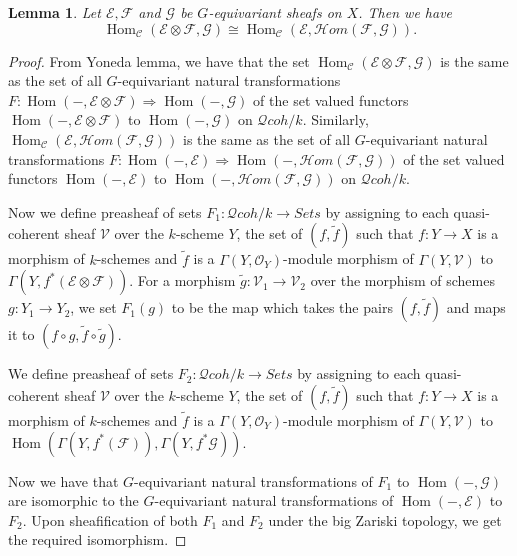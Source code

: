 \documentclass{article}
\newcommand{\Hom}{\operatorname{Hom}}
\newcommand{\sheafhom}{\mathcal{H}\mathit{om}}
\newcommand{\cat}{\mathcal C} %
\newtheorem{lemma}{Lemma}
\begin{document}
\begin{lemma}
  Let $\mathcal E,\mathcal F$ and $\mathcal G$ be $G$-equivariant sheafs on $X$. Then we have
  $$\Hom_\cat(\mathcal E \otimes \mathcal F, \mathcal G) \cong\Hom_\cat(\mathcal E,\sheafhom(\mathcal F,\mathcal G)).$$
\end{lemma}
\begin{proof}
  From Yoneda lemma, we have that the set $\Hom_\cat(\mathcal E \otimes \mathcal F,\mathcal G)$ is the same as 
  the set of all $G$-equivariant natural transformations 
  $F:\Hom(-,\mathcal E \otimes \mathcal F) \Rightarrow \Hom(-,\mathcal G)$ of
  the set valued functors $\Hom(-,\mathcal E \otimes \mathcal F)$ to $\Hom(-,\mathcal G)$ on $\mathcal Qcoh/k$.
  Similarly, $\Hom_\cat(\mathcal E ,\sheafhom(\mathcal F,\mathcal G))$ is the same as 
  the set of all $G$-equivariant natural transformations 
  $F:\Hom(-,\mathcal E) \Rightarrow \Hom(-,\sheafhom(\mathcal F,\mathcal G))$ of
  the set valued functors $\Hom(-,\mathcal E)$ to $\Hom(-,\sheafhom(\mathcal F,\mathcal G))$ on $\mathcal Qcoh/k$.

  Now we define preasheaf of sets $F_1:\mathcal Qcoh/k \rightarrow Sets$ by assigning to each quasi-coherent sheaf
  $\mathcal V$ over the $k$-scheme $Y$, the set of $(f,\tilde f)$ such that $f:Y \rightarrow X$ is a morphism of 
  $k$-schemes and $\tilde f$ is a $\Gamma(Y,\mathcal O_Y)$-module morphism of $\Gamma(Y,\mathcal V)$ to 
  $\Gamma(Y,f^* (\mathcal E \otimes \mathcal F))$. For a morphism $\tilde g:\mathcal V_1 \rightarrow \mathcal V_2$ 
  over the morphism of schemes $g:Y_1 \rightarrow Y_2$, we set $F_1(g)$ to be the map which takes the pairs
  $(f,\tilde f)$ and maps it to $(f \circ g,\tilde f \circ \tilde g )$.

  We define preasheaf of sets $F_2:\mathcal Qcoh/k \rightarrow Sets$ by assigning to each quasi-coherent sheaf
  $\mathcal V$ over the $k$-scheme $Y$, the set of $(f,\tilde f)$ such that $f:Y \rightarrow X$ is a morphism of 
  $k$-schemes and $\tilde f$ is a $\Gamma(Y,\mathcal O_Y)$-module morphism of $\Gamma(Y,\mathcal V)$ to 
  $\Hom(\Gamma(Y,f^*(\mathcal F)),\Gamma(Y,f^*\mathcal G))$.

  Now we have that $G$-equivariant natural transformations of $F_1$ to $\Hom(-,\mathcal G)$ are isomorphic to the
  $G$-equivariant natural transformations of $\Hom(-,\mathcal E)$ to $F_2$. Upon sheafification of both $F_1$ and
  $F_2$ under the big Zariski topology, we get the required isomorphism.
\end{proof}
\end{document}

